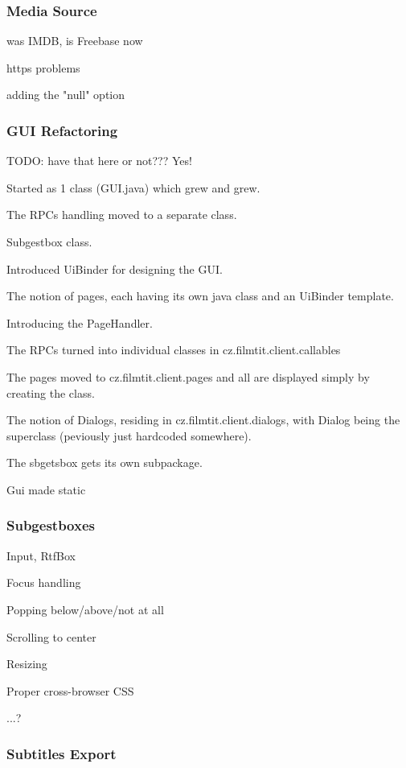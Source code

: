 \subsubsection{Media Source}

was IMDB, is Freebase now

https problems

adding the "null" option

\subsubsection{GUI Refactoring}

TODO: have that here or not??? Yes!

Started as 1 class (GUI.java) which grew and grew.

The RPCs handling moved to a separate class.

Subgestbox class.

Introduced UiBinder for designing the GUI.

The notion of pages, each having its own java class and an UiBinder template.

Introducing the PageHandler.

The RPCs turned into individual classes in cz.filmtit.client.callables

The pages moved to cz.filmtit.client.pages and all are displayed simply by creating the class.

The notion of Dialogs, residing in cz.filmtit.client.dialogs, with Dialog being the superclass (peviously just hardcoded somewhere).

The sbgetsbox gets its own subpackage.

Gui made static

\subsubsection{Subgestboxes}

Input, RtfBox

Focus handling

Popping below/above/not at all

Scrolling to center

Resizing

Proper cross-browser CSS

...?

\subsubsection{Subtitles Export}

